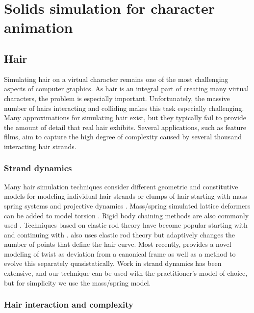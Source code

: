 \section{Solids simulation for character animation}
	\subsection{Hair}
	
Simulating hair on a virtual character remains one of the most
challenging aspects of computer graphics. As hair is an integral
part of creating many virtual characters, the problem is especially important.
Unfortunately, the massive number of hairs interacting and colliding
makes this task especially challenging. Many approximations for
simulating hair exist, but they typically fail to provide the amount of
detail that real hair exhibits. Several applications, such as feature
films, aim to capture the high degree of complexity caused by several 
thousand interacting hair strands.

		\subsubsection{Strand dynamics}
		Many hair simulation techniques consider different geometric and constitutive models
for modeling individual hair strands or clumps of hair starting with
mass spring systems \cite{rosenblum:1991:hair} and projective dynamics
\cite{anjyo:1992:hair}.  Mass/spring simulated lattice deformers can
be added to model torsion
\cite{plante:2002:hair-complexity,selle:2008:hair}.
Rigid body chaining methods are also commonly used
\cite{brown:2004:real-time-knot,choe:2005:simulating-complex-hair,hadap:2006:orientedstrands}.
Techniques based on elastic rod theory have become popular
starting with \cite{pai:2002:strands} and continuing with
\cite{gregoire:2006:interactive-simulation-one-dimensional,bertails:2006:superhelices}.
\cite{spillmann:2007:corde} also uses elastic rod theory but
adaptively changes the number of points that define the hair curve.
Most recently, \cite{bergou:2008:elastic-rods} provides a novel
modeling of twist as deviation from a canonical frame as well as a
method to evolve this separately quasistatically. Work in strand
dynamics has been extensive, and our technique can be used with the
practitioner's model of choice, but for simplicity we use
the mass/spring model.

		\subsubsection{Hair interaction and complexity}
		
